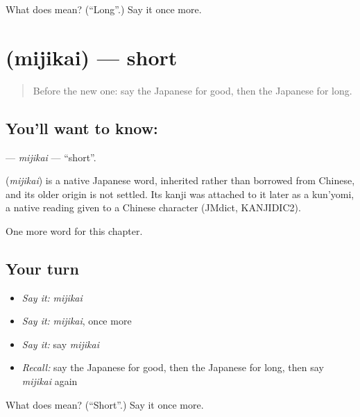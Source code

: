 \begin{tcolorbox}[breakable,colback=teal!4,colframe=teal!35!black,title={Before you move on}]
What does  mean? (\textquotedblleft{}Long\textquotedblright{}.) Say it once more.
\end{tcolorbox}
\section[\texorpdfstring{\ja{みじかい} (mijikai)}{みじかい (mijikai)}]{ (mijikai) — short}

\label{lesson:JA-C48-mijikai}



\begin{quote}
Before the new one: say the Japanese for good, then the Japanese for long.
\end{quote}

\subsection*{You'll want to know: }
\textbf{} — \emph{mijikai} — \textquotedblleft{}short\textquotedblright{}.

\begin{cousinweb}
\textbf{} (\emph{mijikai}) is a native Japanese word, inherited rather than borrowed from Chinese, and its older origin is not settled. Its kanji was attached to it later as a kun'yomi, a native reading given to a Chinese character (JMdict, KANJIDIC2).
\end{cousinweb}

\begin{grammarlens}[title={What you've built}]
One more word for this chapter.
\end{grammarlens}

\subsection*{Your turn}
\begin{itemize}
\raggedright
  \item \emph{Say it:} \emph{mijikai}
  \item \emph{Say it:} \emph{mijikai}, once more
  \item \emph{Say it:} say \emph{mijikai}
  \item \emph{Recall:} say the Japanese for good, then the Japanese for long, then say \emph{mijikai} again
\end{itemize}

\begin{tcolorbox}[breakable,colback=teal!4,colframe=teal!35!black,title={Before you move on}]
What does  mean? (\textquotedblleft{}Short\textquotedblright{}.) Say it once more.
\end{tcolorbox}
